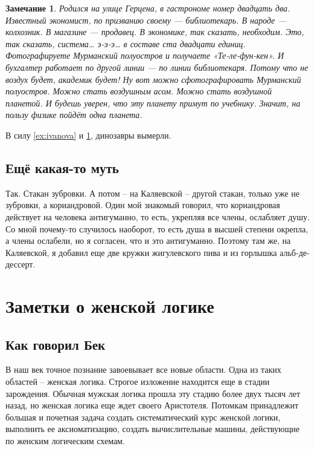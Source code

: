 \documentclass[14pt, a4paper, russian]{report}
\newtheorem{remark}{\indent Замечание}
\begin{document}
\begin{normalsize}
\begin{remark}\label{rem:gertsen}
Родился на улице Герцена, в гастрономе номер двадцать два. Известный экономист, по призванию своему — библиотекарь. В народе — колхозник. В магазине — продавец. В экономике, так сказать, необходим. Это, так сказать, система… э-э-э… в составе ста двадцати единиц. Фотографируете Мурманский полуостров и получаете «Те-ле-фун-кен». И бухгалтер работает по другой линии — по линии библиотекаря. Потому что не воздух будет, академик будет! Ну вот можно сфотографировать Мурманский полуостров. Можно стать воздушным асом. Можно стать воздушной планетой. И будешь уверен, что эту планету примут по учебнику. Значит, на пользу физике пойдёт одна планета. \cite{schizo}
\end{remark}

В силу \cref{ex:ivanova} и \cref{rem:gertsen}, динозавры вымерли.


\section{Ещё какая-то муть}
Так. Стакан зубровки. А потом – на Каляевской – другой стакан, только уже не зубровки, а кориандровой. Один мой знакомый говорил, что кориандровая действует на человека антигуманно, то есть, укрепляя все члены, ослабляет душу. Со мной почему-то случилось наоборот, то есть душа в высшей степени окрепла, а члены ослабели, но я согласен, что и это антигуманно. Поэтому там же, на Каляевской, я добавил еще две кружки жигулевского пива и из горлышка альб-де-дессерт.\cite{erofeev}



\chapter{Заметки о женской логике}
\section{Как говорил Бек}
В наш век точное познание завоевывает все новые области. Одна из таких областей – женская логика. Строгое изложение находится еще в стадии зарождения. Обычная мужская логика прошла эту стадию более двух тысяч лет назад, но женская логика еще ждет своего Аристотеля. Потомкам принадлежит большая и почетная задача создать систематический курс женской логики, выполнить ее аксиоматизацию, создать вычислительные машины, действующие по женским логическим схемам.\cite{bek}


\end{normalsize}
\end{document}
